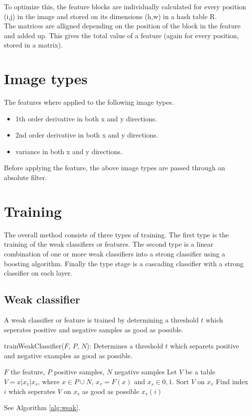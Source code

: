 \documentclass[a4paper,11pt]{article}
\begin{document}
	To optimize this, the feature blocks are individually calculated for every
	position (i,j) in the image and stored on its dimensions (h,w) in a hash
	table R.\\
	The matrices are alligned depending on the position of the block in the
	feature and added up. This gives the total value of a feature (again for
	every position, stored in a matrix).

	\section{Image types}
	The features where applied to the following image types.
	\begin{itemize}
		\item{1th order derivative in both x and y directions.}
		\item{2nd order derivative in both x and y directions.}
		\item{variance in both x and y directions.}
	\end{itemize}
	Before applying the feature, the above image types are passed through an
	absolute filter.


\section*{Training}
The overall method consists of three types of training. The first type is the
training of the weak classifiers or features. The second type is a linear
combination of one or more weak classifiers into a strong classifier using a
boosting algorithm. Finally the type stage is a cascading classifier with a
strong classifier on each layer.
\subsection*{Weak classifier}
A weak classifier or feature is trained by determining a threshold $t$ which
seperates positive and negative samples as good as possible.
\begin{algorithm}
	\caption{trainWeakClassifier($F$, $P$, $N$): Determines a threshold $t$ which
	separets positive and negative examples as good as possible.}
	\begin{algorithmic}[1]
	\REQUIRE $F$ the feature, $P$ positive samples, $N$ negative samples
	\medskip
	\STATE Let $V$ be a table $V = x|x_v|x_s$, where $x \in P \cup N$, $x_v = F(x)$ and $x_s \in {0,1}$.
	\STATE Sort $V$ on $x_v$
	\STATE Find index $i$ which seperates $V$ on $x_s$ as good as possible
	\RETURN $x_v(i)$
	\end{algorithmic}
\label{alg:weak}
\end{algorithm}
See Algorithm \ref{alg:weak}.
\end{document}
